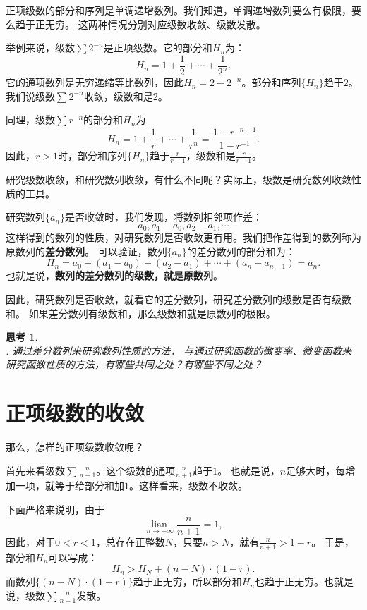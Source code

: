 \documentclass[12pt,UTF8]{ctexbook}
\newcommand{\lian}[1]{
    \underset{#1}{\operatorname{lian}\,}
}
\newtheorem{sk}{思考}[section]
\begin{document}
正项级数的部分和序列是单调递增数列。我们知道，单调递增数列要么有极限，要么趋于正无穷。
这两种情况分别对应级数收敛、级数发散。

举例来说，级数$\sum 2^{-n}$是正项级数。它的部分和$H_n$为：
$$ H_n = 1 + \frac{1}{2} + \cdots + \frac{1}{2^n}.$$
它的通项数列是无穷递缩等比数列，因此$H_n = 2 - 2^{-n}$。部分和序列$\{H_n\}$趋于$2$。
我们说级数$\sum 2^{-n}$收敛，级数和是$2$。

同理，级数$\sum r^{-n}$的部分和$H_n$为
$$ H_n = 1 + \frac{1}{r} + \cdots + \frac{1}{r^n} = \frac{1 - r^{-n-1}}{1 - r^{-1}}.$$
因此，$r>1$时，部分和序列$\{H_n\}$趋于$\frac{r}{r - 1}$，级数和是$\frac{r}{r - 1}$。

研究级数收敛，和研究数列收敛，有什么不同呢？实际上，级数是研究数列收敛性质的工具。

研究数列$\{a_n\}$是否收敛时，我们发现，将数列相邻项作差：
$$ a_0, a_1 - a_0, a_2 - a_1, \cdots $$
这样得到的数列的性质，对研究数列是否收敛更有用。我们把作差得到的数列称为原数列的\textbf{差分数列}。
可以验证，数列$\{a_n\}$的差分数列的部分和为：
$$ H_n = a_0 + (a_1 - a_0) + (a_2 - a_1) + \cdots + (a_n - a_{n-1}) = a_n. $$
也就是说，\textbf{数列的差分数列的级数，就是原数列}。

因此，研究数列是否收敛，就看它的差分数列，研究差分数列的级数是否有级数和。
如果差分数列有级数和，那么级数和就是原数列的极限。

\begin{sk}
    \mbox{} \\
    . 通过差分数列来研究数列性质的方法，
    与通过研究函数的微变率、微变函数来研究函数性质的方法，有哪些共同之处？有哪些不同之处？
\end{sk}

\section{正项级数的收敛}
那么，怎样的正项级数收敛呢？

首先来看级数$\sum \frac{n}{n+1}$。这个级数的通项$\frac{n}{n+1}$趋于$1$。
也就是说，$n$足够大时，每增加一项，就等于给部分和加$1$。这样看来，级数不收敛。

下面严格来说明，由于
$$\lian{n\to +\infty }\frac{n}{n+1} = 1,$$
因此，对于$0<r<1$，总存在正整数$N$，只要$n>N$，就有$\frac{n}{n+1} > 1 - r$。
于是，部分和$H_n$可以写成：
$$ H_n > H_N + (n - N) \cdot (1 - r).$$
而数列$\{(n - N) \cdot (1 - r)\}$趋于正无穷，所以部分和$H_n$也趋于正无穷。也就是说，级数$\sum \frac{n}{n+1}$发散。
\end{document}
